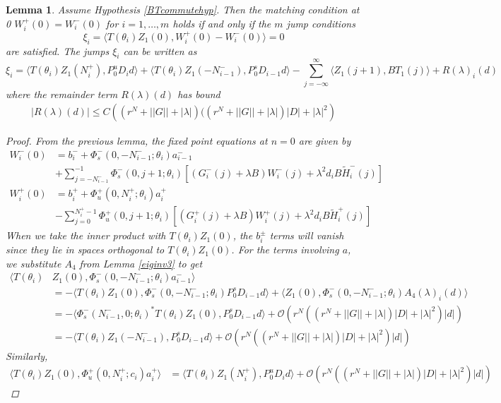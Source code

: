 \documentclass[12pt]{article}
\newtheorem{lemma}{Lemma}
\begin{document}
\begin{lemma}\label{jumpcond}
Assume Hypothesis \ref{BTcommutehyp}. Then the matching condition at 0 $W_i^+(0) = W_i^-(0)$ for $i = 1, \dots, m$ holds if and only if the $m$ jump conditions
\begin{equation}\label{xicond}
\xi_i = \langle T(\theta_i) Z_1(0), W_i^+(0) - W_i^-(0) \rangle = 0
\end{equation}
are satisfied. The jumps $\xi_i$ can be written as 
\begin{equation}\label{xieq}
\xi_i = \langle T(\theta_i) Z_1(N_i^+), P_0^u D_i d \rangle 
+ \langle T(\theta_i) Z_1(-N_{i-1}^-), P_0^s D_{i-1} d \rangle 
- \sum_{j = -\infty}^{\infty} \langle Z_1(j+1), B T_1(j)\rangle + R(\lambda)_i(d)
\end{equation}
where the remainder term $R(\lambda)(d)$ has bound
\begin{align}\label{xiRbound}
|R(\lambda)(d)| \leq C\left( (r^N + ||G|| + |\lambda|)( (r^N + ||G|| + |\lambda|)|D| + |\lambda|^2 \right)
\end{align}

\begin{proof}
From the previous lemma, the fixed point equations at $n = 0$ are given by 
\begin{align*}
W_i^-(0) &= b_i^- +
\Phi_s^-(0, -N_{i-1}^-; \theta_i) a_{i-1}^- \\
&+ \sum_{j = -N_{i-1}^-}^{-1} \Phi_s^-(0, j+1; \theta_i)
[(G_i^-(j) + \lambda B) W_i^-(j) + \lambda^2 d_i B \tilde{H}_i^-(j)] \\
W_i^+(0) &= b_i^+ + \Phi_u^+(0, N_i^+; \theta_i) a_i^+ \\
&- \sum_{j = 0}^{N_i^+-1} \Phi_u^+(0, j+1; \theta_i) 
[(G_i^+(j) + \lambda B) W_i^+(j) + \lambda^2 d_i B \tilde{H}_i^+(j)]
\end{align*}
When we take the inner product with $T(\theta_i)Z_1(0)$, the $b_i^\pm$ terms will vanish since they lie in spaces orthogonal to $T(\theta_i) Z_1(0)$. For the terms involving $a$, we substitute $A_4$ from Lemma \ref{eiginv3} to get
\begin{align*}
\langle T(\theta_i) &Z_1(0), \Phi_s^-(0, -N_{i-1}^-; \theta_i) a_{i-1}^- \rangle \\
&= -\langle T(\theta_i) Z_1(0), \Phi_s^-(0, -N_{i-1}^-; \theta_i) P_0^s D_{i-1} d \rangle + \langle Z_1(0), \Phi_s^-(0, -N_{i-1}^-; \theta_i) A_4(\lambda)_i(d) \rangle \\
&= -\langle \Phi_s^-(N_{i-1}^-, 0; \theta_i)^* T(\theta_i) Z_1(0), P_0^s D_{i-1} d \rangle + \mathcal{O}\left(r^N( (r^N + ||G|| + |\lambda|)|D| + |\lambda|^2 )|d| \right) \\
&= -\langle T(\theta_i) Z_1(-N_{i-1}^-), P_0^s D_{i-1} d \rangle + \mathcal{O}\left(r^N( (r^N + ||G|| + |\lambda|)|D| + |\lambda|^2 )|d| \right)
\end{align*}
Similarly,
\begin{align*}
\langle T(\theta_i) Z_1(0), \Phi_u^+(0, N_i^+; c_i) a_i^+ \rangle
&= \langle T(\theta_i) Z_1(N_i^+), P_0^u D_i d \rangle + \mathcal{O}\left(r^N( (r^N + ||G|| + |\lambda|)|D| + |\lambda|^2 )|d| \right)
\end{align*}


\end{proof}
\end{lemma}
\end{document}
